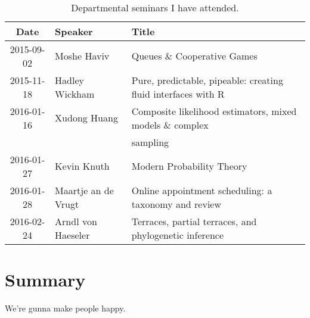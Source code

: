 \documentclass[12pt,a4paper]{article}
\begin{document}
\begin{table}[hh]
\caption{
Departmental seminars I have attended.%
}
\centering
\ ~~~~ \\
\label{tab:seminars}
\begin{tabular}{cll}
\toprule
Date & Speaker & Title \\
\midrule
2015-09-02 & Moshe Haviv &
Queues \& Cooperative Games \\
%
2015-11-18 & Hadley Wickham &
Pure, predictable, pipeable: creating fluid interfaces with R \\
%
2016-01-16 & Xudong Huang &
Composite likelihood estimators, mixed models \& complex \\
&&sampling \\
%
2016-01-27 & Kevin Knuth &
Modern Probability Theory \\
%
2016-01-28 & Maartje an de Vrugt &
Online appointment scheduling: a taxonomy and review \\
%
2016-02-24 & Arndl von Haeseler &
Terraces, partial terraces, and phylogenetic inference \\
%
%
\bottomrule
\end{tabular}
\end{table}




\section{Summary}






We're gunna make people happy.
\end{document}
